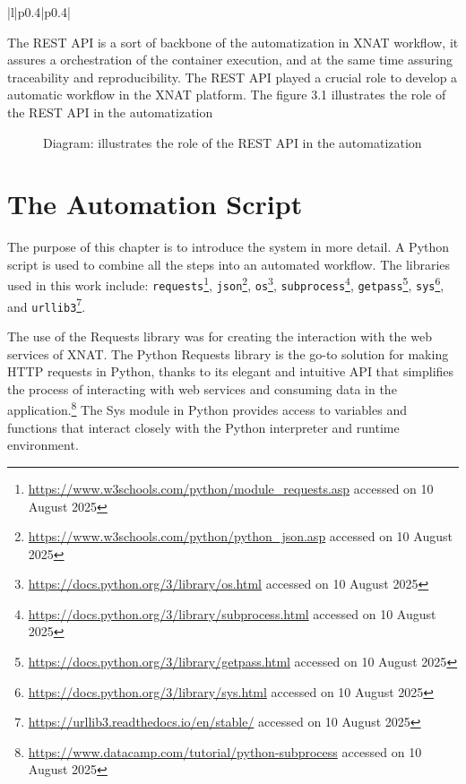 \begin{longtable}{|l|p{0.4\textwidth}|p{0.4\textwidth}|}
\end{longtable}


The REST API is a sort of backbone of the automatization in XNAT workflow, it assures a orchestration of the container execution, and at the same time assuring  traceability and reproducibility. The REST API played a crucial role to develop a automatic workflow in the XNAT platform. The figure 3.1 illustrates the role of the REST API in the automatization


\begin{figure}[ht]
    \centering
    \def\svgwidth{0.9\linewidth}
    
    \caption{Diagram: illustrates the role of the REST API in the automatization}
    \label{fig:workflow-steps}
\end{figure}














\section{The Automation Script}
The purpose of this chapter is to introduce the system in more detail. A Python script is used to combine all the steps into an automated workflow. The libraries used in this work include: \texttt{requests}\footnote{\url{https://www.w3schools.com/python/module_requests.asp} accessed on 10 August 2025}, \texttt{json}\footnote{\url{https://www.w3schools.com/python/python_json.asp} accessed on 10 August 2025}, \texttt{os}\footnote{\url{https://docs.python.org/3/library/os.html} accessed on 10 August 2025}, \texttt{subprocess}\footnote{\url{https://docs.python.org/3/library/subprocess.html} accessed on 10 August 2025}, \texttt{getpass}\footnote{\url{https://docs.python.org/3/library/getpass.html} accessed on 10 August 2025}, \texttt{sys}\footnote{\url{https://docs.python.org/3/library/sys.html} accessed on 10 August 2025}, and \texttt{urllib3}\footnote{\url{https://urllib3.readthedocs.io/en/stable/} accessed on 10 August 2025}.

The use of the Requests library was for creating the interaction with the web services of XNAT. The Python Requests library is the go-to solution for making HTTP requests in Python, thanks to its elegant and intuitive API that simplifies the process of interacting with web services and consuming data in the application.\footnote{\url{https://www.datacamp.com/tutorial/python-subprocess} accessed on 10 August 2025} The Sys module in Python provides access to variables and functions that interact closely with the Python interpreter and runtime environment.

